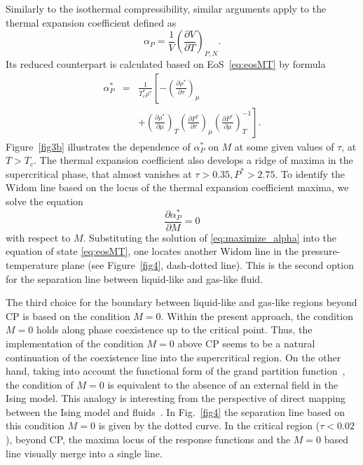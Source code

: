 Similarly to the isothermal compressibility, similar arguments apply to the thermal expansion coefficient defined as
\begin{equation}
	\alpha_{P} = \frac{1}{V} \left(\frac{\partial V}{\partial T}\right)_{P,N}.
\end{equation}
Its reduced counterpart is calculated based on EoS~\eqref{eq:eosMT} by formula
\begin{eqnarray}
	\alpha^*_P & = & \frac{1}{T^*_c \rho^*}
	\left[ 
	-\left(\frac{\partial \rho^*}{\partial \tau}\right)_{\mu}
	\right. \nonumber\\
	&& + \left.\left(\frac{\partial \rho^*}{\partial \mu}\right)_{T}
	\left(\frac{\partial P^*}{\partial \tau}\right)_{\mu}
	\left(\frac{\partial P^*}{\partial \mu}\right)^{-1}_{T} 
	\right].
\end{eqnarray}
Figure~\ref{fig3b} illustrates the dependence of $\alpha^*_{P}$ on $M$ at some given values of $\tau$, at $T>T_c$. The thermal expansion coefficient also develops a ridge of maxima in the supercritical phase, that almost vanishes at $\tau > 0.35, P^*>2.75$.
To identify the Widom line based on the locus of the thermal expansion coefficient maxima, we solve the equation
\begin{equation}\label{eq:maximize_alpha}
	\frac{\partial \alpha_P^*}{\partial M} = 0
\end{equation}
with respect to $M$.
Substituting the solution of \eqref{eq:maximize_alpha} into the equation of state \eqref{eq:eosMT}, one locates another Widom line in the pressure-temperature plane (see Figure~\ref{fig4}, dash-dotted line). This is the second option for the separation line between liquid-like and gas-like fluid.


The third choice for the boundary between liquid-like and gas-like regions beyond CP is based on the condition $M=0$. Within the present approach, the condition $M=0$ holds along phase coexistence up to the critical point. Thus, the implementation of the condition $M=0$ above CP seems to be a natural continuation of the coexistence line into the supercritical region. On the other hand, taking into account the functional form of the grand partition function~\cite{KD16,KR09}, the condition of $M=0$ is equivalent to the absence of an external field in the Ising model. This analogy is interesting from the perspective of direct mapping between the Ising model and fluids~\cite{Kulinskii10jcp,BK11}. In Fig.~\ref{fig4} the separation line based on this condition $M=0$ is given by the dotted curve. In the critical region ($\tau<0.02$), beyond CP, the maxima locus of the response functions and the $M=0$ based line visually merge into a single line. 


